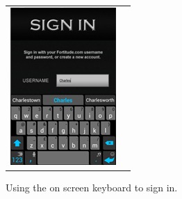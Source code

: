 \begin{figure}[h!]
\begin{tabular}{cc}
\begin{minipage}{0.3\textwidth}
\begin{center}
\begin{minipage}{0.79\textwidth}
		\includegraphics[width=\textwidth]{images/onscreen_keyboard}
		\caption{Using the on screen keyboard to sign in.}
		\label{onscreen_keyboard}
		\end{minipage}
		\end{center}
	\end{minipage}
	\begin{minipage}{0.3\textwidth}
		\begin{center}
		\begin{minipage}{0.83\textwidth}

\end{minipage}
\end{center}
\end{minipage}
\end{tabular}
\end{figure}

